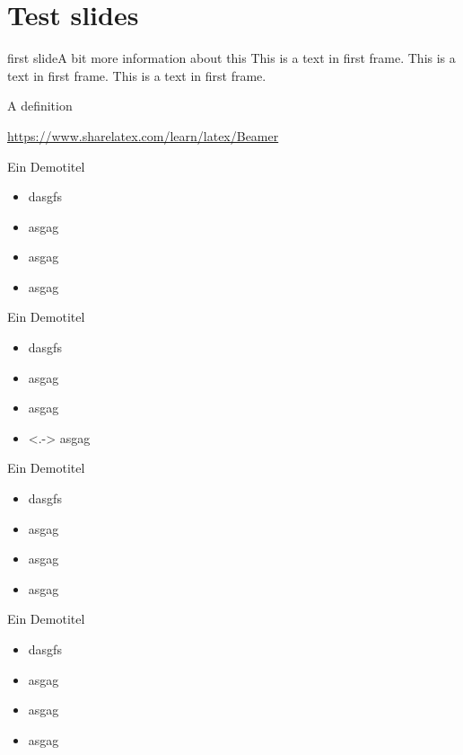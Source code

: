 
\section{Test slides}

\begin{frame}[c]{first slide}{A bit more information about this}
	This is a text in first frame. \pause This is a text in first frame. This is a text in first frame.
	\begin{definition}
		A definition
	\end{definition}
	\url{https://www.sharelatex.com/learn/latex/Beamer}
\end{frame}

\begin{frame}[<+->]{Ein Demotitel}{}
	\begin{itemize}
		\item<1-> dasgfs
		\item<2> asgag
		\item<3-> asgag
		\item asgag
	\end{itemize}
\end{frame}

\begin{frame}[<+->]{Ein Demotitel}{}
	\begin{itemize}
		\item dasgfs
		\item asgag
		\item asgag
		\item<.-> asgag
	\end{itemize}
\end{frame}

\begin{frame}{Ein Demotitel}{}
	\begin{itemize}
		\item<+-> dasgfs
		\item<+-> asgag
		\item<+-> asgag
		\item<+-> asgag
	\end{itemize}
\end{frame}
\begin{frame}{Ein Demotitel}{}
	\begin{itemize}[<+->]
		\item dasgfs
		\item asgag
		\item asgag
		\item asgag
	\end{itemize}
\end{frame}

